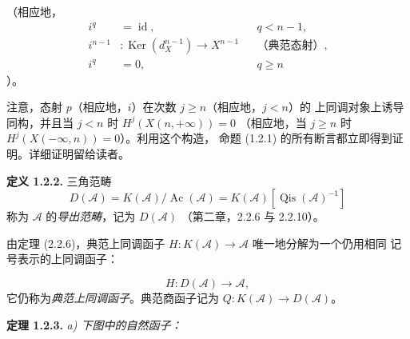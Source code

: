 \clearpage
{}%
\begingroup\small\setlength{\parskip}{0pt}\setlength{\emergencystretch}{1.5em}
\setlength{\abovedisplayskip}{4pt plus 2pt minus 2pt}%
\setlength{\belowdisplayskip}{4pt plus 2pt minus 2pt}%

\noindent（相应地，
\[
\begin{aligned}
i^q&=\operatorname{id},&&q<n-1,\\
i^{n-1}&\colon\operatorname{Ker}(d_X^{n-1})\longrightarrow X^{n-1}
  &&\text{（典范态射）},\\
i^q&=0,&&q\geq n
\end{aligned}
\]
）。

注意，态射 $p$（相应地，$i$）在次数 $j\geq n$（相应地，$j<n$）的
上同调对象上诱导同构，并且当 $j<n$ 时 $H^j(X(n,+\infty))=0$
（相应地，当 $j\geq n$ 时 $H^j(X(-\infty,n))=0$）。利用这个构造，
命题 (1.2.1) 的所有断言都立即得到证明。详细证明留给读者。

\medskip\noindent\textbf{定义 1.2.2.}\quad
三角范畴
\[
D(\mathcal A)=K(\mathcal A)/\operatorname{Ac}(\mathcal A)
=K(\mathcal A)[\operatorname{Qis}(\mathcal A)^{-1}]
\]
称为 $\mathcal A$ 的\emph{导出范畴}，记为 $D(\mathcal A)$
（第二章，2.2.6 与 2.2.10）。

由定理 (2.2.6)，典范上同调函子
$H\colon K(\mathcal A)\longrightarrow\mathcal A$ 唯一地分解为一个仍用相同
记号表示的上同调函子：

\begin{equation}
H\colon D(\mathcal A)\longrightarrow\mathcal A,
\tag{1.2.2.1}
\end{equation}
它仍称为\emph{典范上同调函子}。典范商函子记为
$Q\colon K(\mathcal A)\longrightarrow D(\mathcal A)$。

\medskip\noindent\textbf{定理 1.2.3.}\quad
\textit{a) 下图中的自然函子：}

\begin{center}
\end{center}
\endgroup
